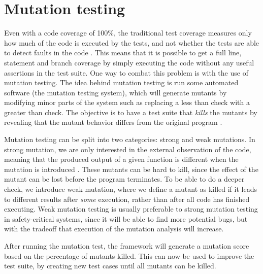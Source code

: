 \section{Mutation testing}
Even with a code coverage of 100\%, the traditional test coverage measures only how much of the code is executed by the tests, and not whether the tests are able to detect faults in the code \cite{pitest}.
This means that it is possible to get a full line, statement and branch coverage by simply executing the code without any useful assertions in the test suite.
One way to combat this problem is with the use of mutation testing.
The idea behind mutation testing is run some automated software (the mutation testing system), which will generate mutants by modifying minor parts of the system such as replacing a less than check with a greater than check.
The objective is to have a test suite that \textit{kills} the mutants by revealing that the mutant behavior differs from the original program \cite{mutationtesting}.

Mutation testing can be split into two categories: strong and weak mutations.
In strong mutation, we are only interested in the external observation of the code, meaning that the produced output of a given function is different when the mutation is introduced \cite{mutationtesting}.
These mutants can be hard to kill, since the effect of the mutant can be lost before the program terminates.
To be able to do a deeper check, we introduce weak mutation, where we define a mutant as killed if it leads to different results after \textit{some} execution, rather than after all code has finished executing.
Weak mutation testing is usually preferable to strong mutation testing in safety-critical systems, since it will be able to find more potential bugs, but with the tradeoff that execution of the mutation analysis will increase.

After running the mutation test, the framework will generate a mutation score based on the percentage of mutants killed.
This can now be used to improve the test suite, by creating new test cases until all mutants can be killed.